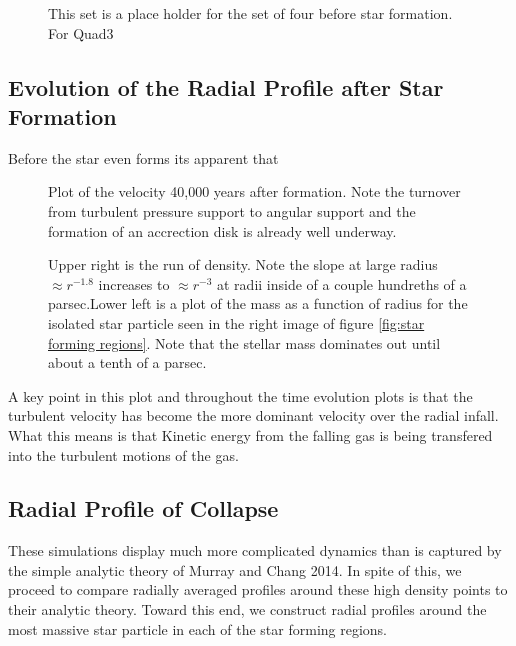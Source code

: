 \documentclass{emulateapj}
\begin{document}
\begin{figure}
\caption{This set is a place holder for the set of four before star formation. For Quad3
\label{fig:quad_000_four}}
\end{figure}


\subsection{Evolution of the Radial Profile after Star Formation}

Before the star even forms its apparent that 

\begin{figure}
\caption{Plot of the velocity 40,000 years after formation. Note the turnover from turbulent  pressure support to angular support and the formation of an accrection disk is already well underway.
\label{fig:quad3_200_velocity}}
\end{figure}


\begin{figure}
\caption{Upper right is the run of density. Note the slope at large radius $\approx r^{-1.8}$ increases to $\approx r^{-3}$ at radii inside of a couple hundreths of a parsec.Lower left is a plot of the mass as a function of radius for the isolated star particle seen in the right image of figure \ref{fig:star forming regions}. Note that the stellar mass dominates out until about a tenth of a parsec.
\label{fig:quad3_320_four}}
\end{figure}

A key point in this plot and throughout the time evolution plots is that the turbulent velocity has become the more dominant velocity over the radial infall. What this means is that Kinetic energy from the falling gas is being transfered into the turbulent motions of the gas.

\subsection{Radial Profile of Collapse}

These simulations display much more complicated dynamics than is captured by the simple analytic theory of Murray and Chang 2014.  In spite of this, we proceed to compare radially averaged profiles around these high density points to their analytic theory.  Toward this end, we construct radial profiles around the most massive star particle in each of the star forming regions.
\end{document}
